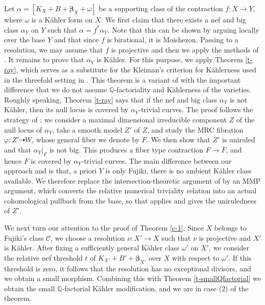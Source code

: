 \documentclass[11pt]{amsart}
\numberwithin{equation}{section}
\def\bbeta{\boldsymbol{\beta}}
\newcommand\Q{{\mathbb{Q}}}
\theoremstyle{definition}
\theoremstyle{definition}
\theoremstyle{definition}
\begin{document}
Let $
\alpha=[K_X+B+\bbeta_X+\omega]$ 
be a supporting class of the contraction $f:X\to Y$, where $\omega$ is a K\"ahler form on $X$. We first claim that there exists a nef and big class $\alpha_Y$ on $Y$ such that $
\alpha=f^*\alpha_Y$. Note that this can be shown by arguing locally over the base $Y$ and that since $f$ is birational, it is Moishezon. Passing to a resolution, we may assume that $f$ is projective and then we apply the methods of \cite{Fuj22}. 
It remains to prove that $\alpha_Y$ is K\"ahler. For this purpose, we apply Theorem \ref{t-ray}, which serves as a substitute for the Kleiman's criterion for K\"ahlerness used in the threefold setting in \cite{HP16,CHP16,DHY23}. This theorem is a variant of \cite[Proposition 3.1]{HP24} with the important difference that we do not assume $\Q$-factoriality and K\"ahlerness of the varieties. Roughly speaking, Theorem \ref{t-ray} says that if the nef and big class $\alpha_Y$ is not K\"ahler, then its null locus is covered by $\alpha_Y$-trivial curves. The proof follows the strategy of \cite{HP24}: we consider a maximal dimensional irreducible
component $Z$ of the null locus of $\alpha_Y$, take a
smooth model $Z'$ of $Z$, and study the MRC fibration
$\varphi: Z'\dasharrow W$, whose general fiber we denote by $F$. We then show that $Z'$ is uniruled and that $\alpha_Y|_F$ is not big. This produces a fiber type contraction $F\to \bar F$, and hence $F$ is covered by $\alpha_Y$-trivial curves. The main difference between our approach and \cite{HP24} is that, a priori $Y$ is only Fujiki, there is no ambient K\"ahler class available. We therefore replace the intersection-theoretic argument of \cite{HP24} by an MMP
argument, which converts the relative numerical triviality relation into an actual cohomological pullback from
the base, 
so that \cite[Theorem 2.2]{HP24} applies and gives the uniruledness of $Z'$.

We next turn our attention to the proof of Theorem \ref{c-1}. Since $X$ belongs to Fujiki's class $\mathcal C$, we choose a resolution $
\nu: X'\to X$ such that $\nu$ is projective and $X'$ is K\"ahler.
After fixing a sufficiently general K\"ahler class $\omega'$ on $X'$, we consider the relative nef threshold $t$ of $
K_{X'}+B'+\bbeta_{X'}
$
over $X$ with respect to $\omega'$. If this threshold is zero, it follows that the resolution has no exceptional divisors, and we obtain a small morphism. Combining this with Theorem \ref{t-smallQfactorial} we obtain the small $\Q$-factorial K\"ahler modification, and we are in case (2) of the theorem.
\end{document}

